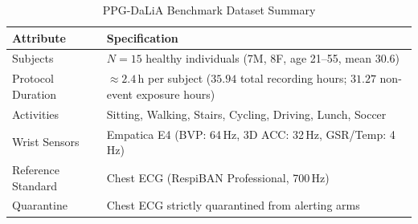 \begin{table}[htbp]
\caption{PPG-DaLiA Benchmark Dataset Summary \cite{ref_reiss_dalia}}
\label{tab:dataset}
\centering
\scriptsize
\begin{tabular}{|l|p{4.8cm}|}
\hline
\textbf{Attribute} & \textbf{Specification} \\
\hline
Subjects & $N = 15$ healthy individuals (7M, 8F, age 21--55, mean 30.6) \\
\hline
Protocol Duration & $\approx 2.4$\,h per subject ($35.94$ total recording hours; $31.27$ non-event exposure hours) \\
\hline
Activities & Sitting, Walking, Stairs, Cycling, Driving, Lunch, Soccer \\
\hline
Wrist Sensors & Empatica E4 (BVP: 64\,Hz, 3D ACC: 32\,Hz, GSR/Temp: 4\,Hz) \\
\hline
Reference Standard & Chest ECG (RespiBAN Professional, 700\,Hz) \\
\hline
Quarantine & Chest ECG strictly quarantined from alerting arms \\
\hline
\end{tabular}
\end{table}
